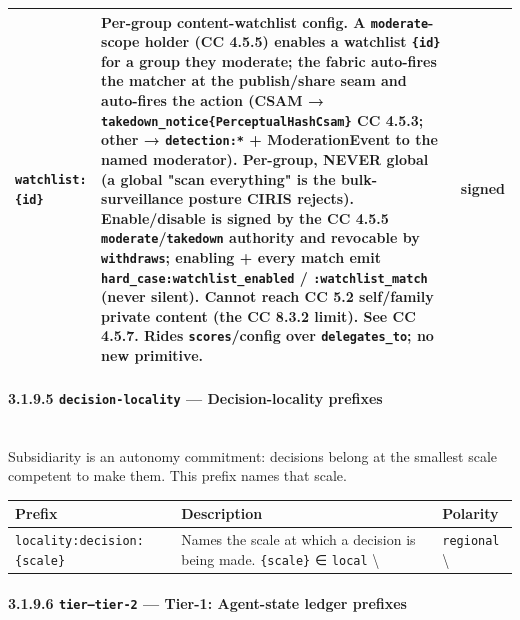 \documentclass[11pt]{article}
\begin{document}
{\begin{longtable}{|p{5.33cm}|p{5.33cm}|p{5.33cm}|}
\texttt{watchlist:\{id\}} & \textbf{Per-group content-watchlist config}. A \texttt{moderate}-scope holder (CC 4.5.5) enables a watchlist \texttt{\{id\}} for a group they moderate; the fabric auto-fires the matcher at the \textbf{publish/share seam} and auto-fires the action (CSAM → \texttt{takedown\_notice\{PerceptualHashCsam\}} CC 4.5.3; other → \texttt{detection:*} + ModerationEvent to the named moderator). \textbf{Per-group, NEVER global} (a global "scan everything" is the bulk-surveillance posture CIRIS rejects). Enable/disable is signed by the CC 4.5.5 \texttt{moderate}/\texttt{takedown} authority and revocable by \texttt{withdraws}; enabling + every match emit \texttt{hard\_case:watchlist\_enabled} / \texttt{:watchlist\_match} (never silent). Cannot reach CC 5.2 self/family private content (the CC 8.3.2 limit). See CC 4.5.7. Rides \texttt{scores}/config over \texttt{delegates\_to}; no new primitive. & signed \\ \hline
\end{longtable}}


\paragraph{3.1.9.5 \texttt{decision-locality} — Decision-locality prefixes}\mbox{}\\


Subsidiarity is an autonomy commitment: decisions belong at the smallest scale competent to make them. This prefix names that scale.


{\footnotesize
\begin{longtable}{|p{5.33cm}|p{5.33cm}|p{5.33cm}|}\hline
\textbf{Prefix} & \textbf{Description} & \textbf{Polarity} \\ \hline\endhead
\texttt{locality:decision:\{scale\}} & Names the scale at which a decision is being made. \texttt{\{scale\}} ∈ \texttt{local} \textbackslash{} & \texttt{regional} \textbackslash{} \\ \hline
\end{longtable}}


\paragraph{3.1.9.6 \texttt{tier--tier-2} — Tier-1: Agent-state ledger prefixes}\mbox{}\\
\end{document}
